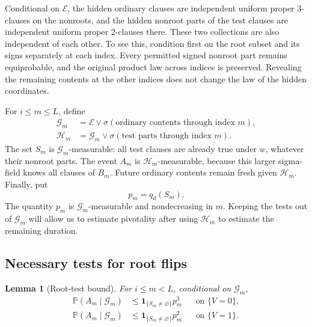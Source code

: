 \documentclass[11pt]{article}
\newtheorem{lemma}[theorem]{Lemma}
\theoremstyle{remark}
\newcommand{\Prb}{\mathbb P}
\newcommand{\ind}{\mathbf 1}
\newcommand{\cE}{\mathcal E}
\newcommand{\cG}{\mathcal G}
\newcommand{\cH}{\mathcal H}
\numberwithin{equation}{section}
\begin{document}
Conditional on $\cE$, the hidden ordinary clauses are independent uniform
proper 3-clauses on the nonroots, and the hidden nonroot parts of the
test clauses are independent uniform proper 2-clauses there.
These two collections are also independent of each other.
To see this, condition first on the root subset and its signs separately
at each index. Every permitted signed nonroot part remains equiprobable,
and the original product law across indices is preserved. Revealing
the remaining contents at the other indices does not change the law
of the hidden coordinates.

For $i\le m\le L$, define
\begin{align*}
 \cG_m&=\cE\vee\sigma(\text{ordinary contents through index }m),\\
 \cH_m&=\cG_m\vee\sigma(\text{test parts through index }m).
\end{align*}
The set $S_m$ is $\cG_m$-measurable: all test clauses are already true
under $w$, whatever their nonroot parts. The event $A_m$ is
$\cH_m$-measurable, because this larger sigma-field knows all clauses
of $B_m$. Future ordinary contents remain fresh given $\cH_m$.
Finally, put
\begin{equation}
 p_m=q_d(S_m).
 \label{eq:p}
\end{equation}
The quantity $p_m$ is $\cG_m$-measurable and nondecreasing in $m$.
Keeping the tests out of $\cG_m$ will allow us to estimate pivotality
after using $\cH_m$ to estimate the remaining duration.

\subsection{Necessary tests for root flips}

\begin{lemma}[Root-test bound]
\label{lem:tests}
For $i\le m<L$, conditional on $\cG_m$,
\begin{align}
 \Prb(A_m\mid\cG_m)&\le\ind_{\{S_m\ne\varnothing\}}p_m^3
                         &&\text{on }\{V=0\},\label{eq:test3}\\
 \Prb(A_m\mid\cG_m)&\le\ind_{\{S_m\ne\varnothing\}}p_m^2
                         &&\text{on }\{V=1\}.
 \label{eq:test2}
\end{align}
\end{lemma}
\end{document}
